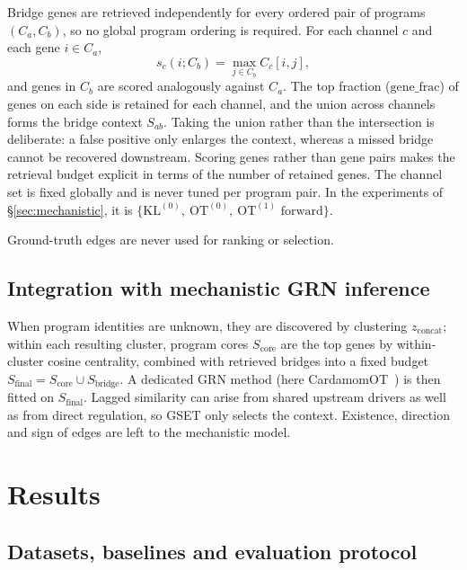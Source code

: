 \documentclass[10pt, letterpaper]{article}
\DeclareRobustCommand{\eliasadds}[1]{{\color{red}#1}}
\begin{document}
Bridge genes are retrieved independently for every ordered pair of programs $(C_a,C_b)$, so no global program ordering is required. For each channel $c$ and each gene $i\in C_a$,
\[
s_c(i;C_b)=\max_{j\in C_b}C_c[i,j],
\]
and genes in $C_b$ are scored analogously against $C_a$. The top fraction ($\mathrm{gene\_frac}$) of genes on each side is retained for each channel, and the union across channels forms the bridge context $S_{ab}$. \eliasadds{Taking the union rather than the intersection is deliberate: a false positive only enlarges the context, whereas a missed bridge cannot be recovered downstream.} Scoring genes rather than gene pairs makes the retrieval budget explicit in terms of the number of retained genes. The channel set is fixed globally and is never tuned per program pair.  In the experiments of \S\ref{sec:mechanistic}, it is $\{\mathrm{KL}^{(0)},\ \mathrm{OT}^{(0)},\ \mathrm{OT}^{(1)}\text{ forward}\}$.

Ground-truth edges are never used for ranking or selection.

\subsection{Integration with mechanistic GRN inference}
\label{sec:cardamom}

When program identities are unknown, they are discovered by clustering $z_{\mathrm{concat}}$; within each resulting cluster, program cores $S_{\mathrm{core}}$ are the top genes by within-cluster cosine centrality, combined with retrieved bridges into a fixed budget $S_{\mathrm{final}}=S_{\mathrm{core}}\cup S_{\mathrm{bridge}}$. A dedicated GRN method (here CardamomOT~\cite{ventre2026cardamomot}) is then fitted on $S_{\mathrm{final}}$. Lagged similarity can arise from shared upstream drivers as well as from direct regulation, so GSET only selects the context. Existence, direction and sign of edges are left to the mechanistic model.

\section{Results}
\label{sec:results}

\subsection{Datasets, baselines and evaluation protocol}
\label{sec:setup}
\end{document}
